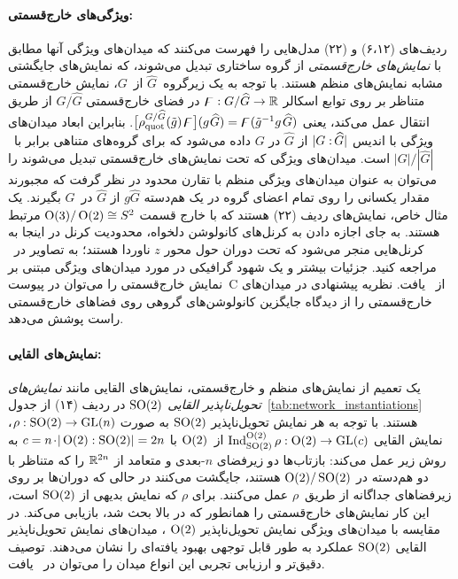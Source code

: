 \paragraph{ویژگی‌های خارج‌قسمتی:}
ردیف‌های (۶،۱۲) و (۲۲) مدل‌هایی را فهرست می‌کنند که میدان‌های ویژگی آنها مطابق با \emph{نمایش‌های خارج‌قسمتی} از گروه ساختاری تبدیل می‌شوند، که نمایش‌های جایگشتی مشابه نمایش‌های منظم هستند.
با توجه به یک زیرگروه~$\widehat{G}$ از~$G$، نمایش خارج‌قسمتی متناظر بر روی توابع اسکالر $\digamma: G/\widehat{G} \to \mathbb{R}$ در فضای خارج‌قسمتی $G/\widehat{G}$ از طریق انتقال عمل می‌کند، یعنی
$\big[\rho_\textup{quot}^{G/\widehat{G}} (\tilde{g})\mkern2mu \digamma\big] (g\mkern1mu \widehat{G}) = \digamma(\tilde{g}^{-1}g \mkern2mu \widehat{G})$.
بنابراین ابعاد میدان‌های ویژگی با اندیس ${|G:\mkern-2mu\widehat{G}|}$ از $\widehat{G}$ در $G$ داده می‌شود که برای گروه‌های متناهی برابر با~$|G|/|\widehat{G}|$ است.
میدان‌های ویژگی که تحت نمایش‌های خارج‌قسمتی تبدیل می‌شوند را می‌توان به عنوان میدان‌های ویژگی منظم با تقارن محدود در نظر گرفت که مجبورند مقدار یکسانی را روی تمام اعضای گروه در یک هم‌دسته $g\widehat{G}$ از $\widehat{G}$ در~$G$ بگیرند.
یک مثال خاص، نمایش‌های ردیف (۲۲) هستند که با خارج‌ قسمت $\operatorname{O}(3)/\operatorname{O}(2) \cong S^2$ مرتبط هستند.
به جای اجازه دادن به کرنل‌های کانولوشن دلخواه، محدودیت کرنل در اینجا به کرنل‌هایی منجر می‌شود که تحت دوران حول محور $z$ ناوردا هستند؛ به تصاویر در~\cite{janssen2018design} مراجعه کنید.
جزئیات بیشتر و یک شهود گرافیکی در مورد میدان‌های ویژگی مبتنی بر نمایش خارج‌قسمتی را می‌توان در پیوست~C از~\cite{Weiler2019_E2CNN} یافت.
نظریه پیشنهادی در \cite{Kondor2018-GENERAL} میدان‌های خارج‌قسمتی را از دیدگاه جایگزین کانولوشن‌های گروهی روی فضاهای خارج‌قسمتی راست پوشش می‌دهد.


\paragraph{نمایش‌های القایی:}
یک تعمیم از نمایش‌های منظم و خارج‌قسمتی، نمایش‌های القایی مانند \emph{نمایش‌های تحویل‌ناپذیر القایی $\operatorname{SO}(2)$} در ردیف (۱۴)
از جدول~\ref{tab:network_instantiations} هستند.
با توجه به هر نمایش تحویل‌ناپذیر $\operatorname{SO}(2)$ به صورت $\rho: \operatorname{SO}(2) \to \operatorname{GL}(n)$، نمایش القایی $\operatorname{Ind}_{\operatorname{SO}(2)}^{\operatorname{O}(2)}\rho: \operatorname{O}(2) \to \operatorname{GL}(c)$ از~$\operatorname{O}(2)$ با $c = n \mkern-2mu\cdot\! {|\operatorname{O}(2):\operatorname{SO}(2)|} = 2n$
به روش زیر عمل می‌کند:
بازتاب‌ها دو زیرفضای $n$-بعدی و متعامد از $\mathbb{R}^{2n}$ را که متناظر با دو هم‌دسته در $\operatorname{O}(2)/\operatorname{SO}(2)$ هستند، جایگشت می‌کنند در حالی که دوران‌ها بر روی زیرفضاهای جداگانه از طریق~$\rho$ عمل می‌کنند.
برای $\rho$ که نمایش بدیهی از $\operatorname{SO}(2)$ است، این کار نمایش‌های خارج‌قسمتی را همانطور که در بالا بحث شد، بازیابی می‌کند.
در مقایسه با میدان‌های ویژگی نمایش تحویل‌ناپذیر $\operatorname{O}(2)$ ، میدان‌های نمایش تحویل‌ناپذیر القایی $\operatorname{SO}(2)$ عملکرد به طور قابل توجهی بهبود یافته‌ای را نشان می‌دهند.
توصیف دقیق‌تر و ارزیابی تجربی این انواع میدان را می‌توان در~\cite{Weiler2019_E2CNN} یافت.


